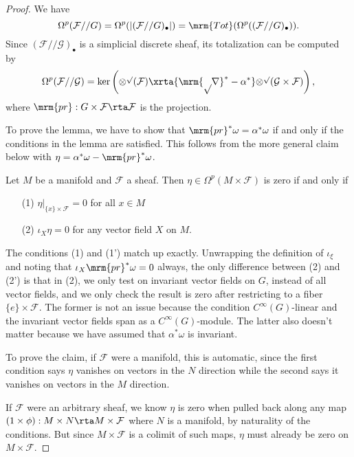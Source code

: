 \begin{proof}
  We have
  \[
    \Omega^p (\mathcal{F} // G) = \Omega^p(|(\mathcal{F}// G)_\bullet |) = \mrm{Tot}(\Omega^p((\mathcal{F}// G)_\bullet)).
  \]
  Since $(\mathcal{F}// \mathcal{G})_\bullet$ is a simplicial discrete sheaf, its totalization can be computed by
 \[
 \Omega^p(\cal{F}//G)=\ker\left(\Omega^p(\cal{F})\xrta{\mrm{pr}^*-\alpha^*}\Omega^p(G\times\cal{F})\right),
 \]
   where $\mrm{pr}: G \times \mathcal{F} \rta \mathcal{F}$ is the projection.

  To prove the lemma, we have to show that $\mrm{pr}^* \omega = \alpha^* \omega$ if and only if the conditions in the lemma are satisfied. This follows from the more general claim below with $\eta = \alpha^* \omega - \mrm{pr}^* \omega$.
  \begin{claim}
    Let $M$ be a manifold and $\mathcal{F}$ a sheaf. Then $\eta \in \Omega^p(M \times \mathcal{F})$ is zero if and only if
    \begin{enumerate}
      \item[(1)] $\eta|_{\{x\} \times \mathcal{F}} = 0$ for all $x \in M$
      \item[(2)] $\iota_X \eta = 0$ for any vector field $X$ on $M$.
    \end{enumerate}
  \end{claim}

  The conditions (1) and (1') match up exactly. Unwrapping the definition of $\iota_\xi$ and noting that $\iota_X \mrm{pr}^* \omega = 0$ always, the only difference between (2) and (2') is that in (2), we only test on invariant vector fields on $G$, instead of all vector fields, and we only check the result is zero after restricting to a fiber $\{e\} \times \mathcal{F}$. The former is not an issue because the condition $C^\infty(G)$-linear and the invariant vector fields span as a $C^\infty(G)$-module. The latter also doesn't matter because we have assumed that $\alpha^* \omega$ is invariant. 

  To prove the claim, if $\mathcal{F}$ were a manifold, this is automatic, since the first condition says $\eta$ vanishes on vectors in the $N$ direction while the second says it vanishes on vectors in the $M$ direction.

  If $\mathcal{F}$ were an arbitrary sheaf, we know $\eta$ is zero when pulled back along any map $(1 \times \phi): M \times N \rta M \times \mathcal{F}$ where $N$ is a manifold, by naturality of the conditions. But since $M \times \mathcal{F}$ is a colimit of such maps, $\eta$ must already be zero on $M \times \mathcal{F}$.
\end{proof}

